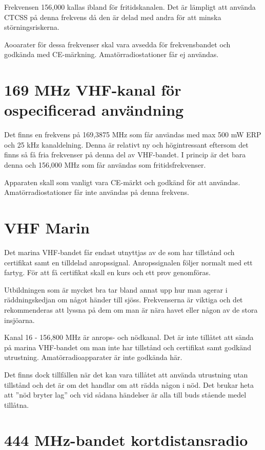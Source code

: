 \documentclass[12ypt,swedish,a4paper]{report}
\begin{document}
Frekvensen 156,000 kallas ibland för fritidskanalen. Det är lämpligt att använda CTCSS på denna frekvens då den är delad med andra för att minska störningsriskerna.

Aooarater för dessa frekvenser skal vara avsedda för frekvensbandet och godkända med CE-märkning. Amatörradiostationer får ej användas.


\section{169 MHz VHF-kanal för ospecificerad användning}

Det finns en frekvens på 169,3875 MHz som får användas med max 500 mW ERP och 25 kHz kanaldelning. Denna är relativt ny och högintressant eftersom det finns så få fria frekvenser på denna del av VHF-bandet. I princip är det bara denna och 156,000 MHz som får användas som fritidsfrekvenser.

Apparaten skall som vanligt vara CE-märkt och godkänd för att användas. Amatörradiostationer får inte användas på denna frekvens.

\section{VHF Marin}

Det marina VHF-bandet får endast utnyttjas av de som har tillstånd och certifikat samt en tilldelad anropssignal. Anropssignalen följer normalt med ett fartyg. För att få certifikat skall en kurs och ett prov genomföras.

Utbildningen som är mycket bra tar bland annat upp hur man agerar i räddningskedjan om något händer till sjöss. Frekvenserna är viktiga och det rekommenderas att lyssna på dem om man är nära havet eller någon av de stora insjöarna.

Kanal 16 - 156,800 MHz är anrops- och nödkanal. Det är inte tillåtet att sända på marina VHF-bandet om man inte har tillstånd och certifikat samt godkänd utrustning. Amatörradioapparater är inte godkända här.

Det finns dock tillfällen när det kan vara tillåtet att använda utrustning utan tillstånd och det är om det handlar om att rädda någon i nöd. Det brukar heta att ''nöd bryter lag'' och vid sådana händelser är alla till buds stående medel tillåtna.

\section{444 MHz-bandet kortdistansradio}
\end{document}
